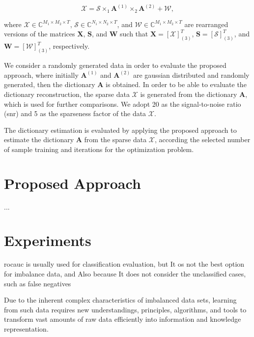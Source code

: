 \begin{equation}\label{eq:eq03}
\boldsymbol{\mathcal{X}} = \boldsymbol{\mathcal{S}} \times_1 \boldsymbol{A}^{(1)} \times_2 \boldsymbol{A}^{(2)} +  \boldsymbol{\mathcal{W}},
\end{equation}

where $\boldsymbol{\mathcal{X}} \in \mathbb{C}^{M_1 \times M_2 \times T}$, $\boldsymbol{\mathcal{S}} \in \mathbb{C}^{N_1 \times N_2 \times T}$, and $\boldsymbol{\mathcal{W}} \in \mathbb{C}^{M_1 \times M_2 \times T}$ are rearranged versions of the matrices $\boldsymbol{X}$, $\boldsymbol{S}$, and $\boldsymbol{W}$ such that $\boldsymbol{X} = [\boldsymbol{\mathcal{X}}]_{(3)}^T$, $\boldsymbol{S} = [\boldsymbol{\mathcal{S}}]_{(3)}^T$, and $\boldsymbol{W} = [\boldsymbol{\mathcal{W}}]_{(3)}^T$, respectively.

We consider a randomly generated data in order to evaluate the proposed approach, where initially $\boldsymbol{A}^{(1)}$ and $\boldsymbol{A}^{(2)}$ are gaussian distributed and randomly generated, then the dictionary $\boldsymbol{A}$ is obtained. In order to be able to evaluate the dictionary reconstruction, the sparse data $\boldsymbol{\mathcal{X}}$ is generated from the dictionary $\boldsymbol{A}$, which is used for further comparisons. We adopt 20 as the signal-to-noise ratio (snr) and 5 as the sparseness factor of the data $\boldsymbol{\mathcal{X}}$. 

The dictionary estimation is evaluated by applying the proposed approach to estimate the dictionary $\boldsymbol{A}$ from the sparse data $\boldsymbol{\mathcal{X}}$, according the selected number of sample training and iterations for the optimization problem.

\section{Proposed Approach}

...

\section{Experiments}

rocauc is usually used for classification evaluation, but It os not the best option for imbalance data, and Also because It does not consider the unclassified cases, such as false negatives

Due to the inherent complex characteristics of imbalanced data sets, learning from such data requires new understandings, principles, algorithms, and tools to transform vast amounts of raw data efficiently into information and knowledge representation.

